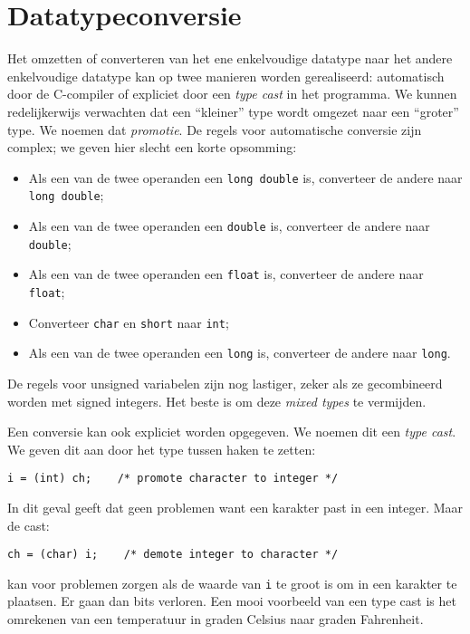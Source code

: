 \section{Datatypeconversie}
Het omzetten of converteren van het ene enkelvoudige datatype naar het andere enkelvoudige datatype kan op twee manieren worden gerealiseerd: automatisch door de C-compiler of expliciet door een \textsl{type cast} in het programma. We kunnen redelijkerwijs verwachten dat een ``kleiner'' type wordt omgezet naar een ``groter'' type. We noemen dat \textsl{promotie}. De regels voor automatische conversie zijn complex; we geven hier slecht een korte opsomming:

\begin{itemize}
\item Als een van de twee operanden een \texttt{long double} is, converteer de andere naar \texttt{long double};
\item Als een van de twee operanden een \texttt{double} is, converteer de andere naar \texttt{double};
\item Als een van de twee operanden een \texttt{float} is, converteer de andere naar \texttt{float};
\item Converteer \texttt{char} en \texttt{short} naar \texttt{int};
\item Als een van de twee operanden een \texttt{long} is, converteer de andere naar \texttt{long}.
\end{itemize}

De regels voor unsigned variabelen zijn nog lastiger, zeker als ze gecombineerd worden met signed integers. Het beste is om deze \textsl{mixed types} te vermijden.

Een conversie kan ook expliciet worden opgegeven. We noemen dit een \textsl{type cast}. We geven dit aan door het type tussen haken te zetten:

\hspace*{1em}\texttt{i = (int) ch; \ \ \  /* promote character to integer */}

In dit geval geeft dat geen problemen want een karakter past in een integer. Maar de cast:

\hspace*{1em}\texttt{ch = (char) i; \ \ \  /* demote integer to character */}

kan voor problemen zorgen als de waarde van \texttt{i} te groot is om in een karakter te plaatsen. Er gaan dan bits verloren. Een mooi voorbeeld van een type cast is het omrekenen van een temperatuur in graden Celsius naar graden Fahrenheit. 


